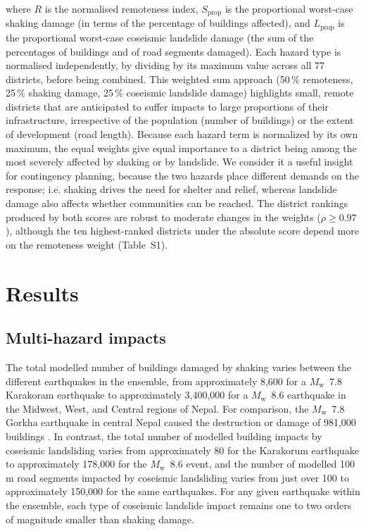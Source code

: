 \documentclass[nhess, manuscript]{copernicus}
\begin{document}
where $R$ is the normalised remoteness index, $S_{\text{prop}}$ is the proportional worst-case shaking damage (in terms of the percentage of buildings affected), and $L_{\text{prop}}$ is the proportional worst-case coseismic landslide damage (the sum of the percentages of buildings and of road segments damaged). Each hazard type is normalised independently, by dividing by its maximum value across all 77 districts, before being combined. This weighted sum approach (50\,\% remoteness, 25\,\% shaking damage, 25\,\% coseismic landslide damage) highlights small, remote districts that are anticipated to suffer impacts to large proportions of their infrastructure, irrespective of the population (number of buildings) or the extent of development (road length). Because each hazard term is normalized by its own maximum, the equal weights give equal importance to a district being among the most severely affected by shaking or by landslide. We consider it a useful insight for contingency planning, because the two hazards place different demands on the response; i.e. shaking drives the need for shelter and relief, whereas landslide damage also affects whether communities can be reached. The district rankings produced by both scores are robust to moderate changes in the weights ($\rho \geq 0.97$), although the ten highest-ranked districts under the absolute score depend more on the remoteness weight (Table~S1).

\section{Results}

\subsection{Multi-hazard impacts}

The total modelled number of buildings damaged by shaking varies between the different earthquakes in the ensemble, from approximately 8,600 for a $M_{\mathrm{w}}$~7.8 Karakoram earthquake to approximately 3,400,000 for a $M_{\mathrm{w}}$~8.6 earthquake in the Midwest, West, and Central regions of Nepal. For comparison, the $M_{\mathrm{w}}$~7.8 Gorkha earthquake in central Nepal caused the destruction or damage of 981,000 buildings \citep{NationalPlanningCommission2015}. In contrast, the total number of modelled building impacts by coseismic landsliding varies from approximately 80 for the Karakorum earthquake to approximately 178,000 for the $M_{\mathrm{w}}$~8.6 event, and the number of modelled 100\,\unit{m} road segments impacted by coseismic landsliding varies from just over 100 to approximately 150,000 for the same earthquakes. For any given earthquake within the ensemble, each type of coseismic landslide impact remains one to two orders of magnitude smaller than shaking damage.
\end{document}
